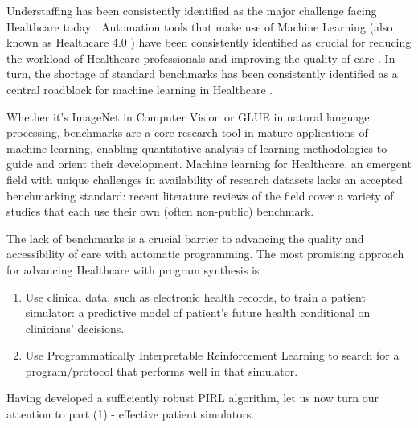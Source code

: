 Understaffing has been consistently identified as the major challenge facing Healthcare today \cite{ashleyy.metcalfHospitalUnitUnderstaffing2016,SurveyShowsHidden1993,UnderstaffingSignificantIssue2012,campbellUniversalHealthCoverage2013, hudsonUnderstaffing2015, mercerMessageEditorinChief2008, r.stanleyUnderstaffedOverwhelmed2010, munnUnderstaffingWardsCompromising2017, thelancetHealthcareSystemStaffing2018}. Automation tools that make use of Machine Learning (also known as Healthcare 4.0 \cite{tortorellaHealthcareTrendsChallenges2020}) have been consistently identified as crucial for reducing the workload of Healthcare professionals and improving the quality of care \cite{agrawalMachineLearningHealthcare2020, deviDesignImplementationAdvanced2022, g.kumarSurveyMachineLearning2016, ganguliMachineLearningPursuit2020, maityMachineLearningImproved2017, mitraMachineLearningHealthcare2021, pianykhImprovingHealthcareOperations2020, xhaferraRoleMachineLearning2022}. In turn, the shortage of standard benchmarks has been consistently identified as a central roadblock for machine learning in Healthcare \cite{Crown2015Potential, David2020Evaluating, guSupervisedLearningPervasive2023, harutyunyanMultitaskLearningBenchmarking2019, Kathrin2022Benchmark, liventsevEffectivePatientSimulators2021, mcdermottReproducibilityMachineLearning2021, purushothamBenchmarkingDeepLearning2018, S2017Benchmark}.

Whether it's ImageNet \cite{dengImagenetLargescaleHierarchical2009} in Computer Vision or GLUE \cite{wangGLUEMultitaskBenchmark2018} in natural language processing, benchmarks are a core research tool in mature applications of machine learning, enabling quantitative analysis of learning methodologies to guide and orient their development.
Machine learning for Healthcare, an emergent field with unique challenges in availability of research datasets \cite{Anshik2021Handling, Gilbert2015market, Pahwa2021Big, Yazhini2019State} lacks an accepted benchmarking standard: recent literature reviews \cite{palMachineLearningHealthcare2023,tortorellaHealthcareTrendsChallenges2020} of the field cover a variety of studies that each use their own (often non-public) benchmark.

The lack of benchmarks is a crucial barrier to advancing the quality and accessibility of care with automatic programming. 
The most promising approach for advancing Healthcare with program synthesis is
\begin{enumerate}
    \item Use clinical data, such as electronic health records, to train a patient simulator: a predictive model of patient’s future health conditional on clinicians’ decisions. 
    \item Use Programmatically Interpretable Reinforcement Learning to search for a program/protocol that performs well in that simulator.
\end{enumerate}

Having developed a sufficiently robust PIRL algorithm, let us now turn our attention to part (1) - effective patient simulators.